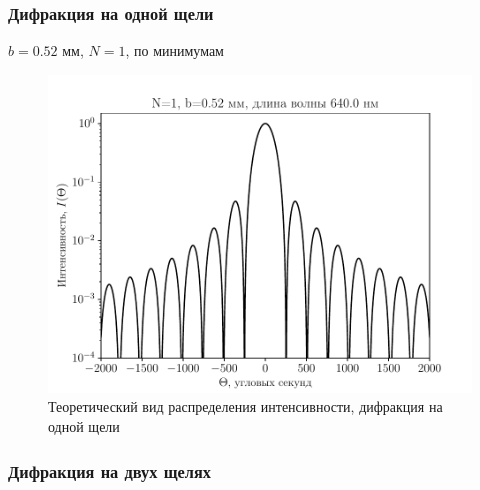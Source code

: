 \subsubsection{Дифракция на одной щели}
\begin{table}[H]
	    \caption{$b=0.52$ мм, $N=1$, по минимумам}
	    \label{tab:chem1}

	\xdef\deltaG{275} 
	\xdef\deltaM{58}
	\xdef\deltaS{59}
	\mytable
	
\end{table}
\begin{figure}[H]
	\centering
	\includegraphics[]{plot/N1}
	\caption{Теоретический вид распределения интенсивности, дифракция на одной щели}
	\label{fig:figure1}
\end{figure}
\subsubsection{Дифракция на двух щелях}

